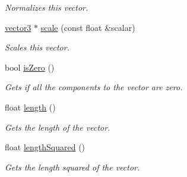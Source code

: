 \begin{DoxyCompactItemize}
\begin{DoxyCompactList}\small\item\em Normalizes this vector. \end{DoxyCompactList}\item 
\hyperlink{classflounder_1_1vector3}{vector3} $\ast$ \hyperlink{classflounder_1_1vector3_ac3556b660b1ce874086da0f185b2630a}{scale} (const float \&scalar)
\begin{DoxyCompactList}\small\item\em Scales this vector. \end{DoxyCompactList}\item 
bool \hyperlink{classflounder_1_1vector3_ad7a7694fbfc9cdd7b05a27684aaed63a}{is\+Zero} ()
\begin{DoxyCompactList}\small\item\em Gets if all the components to the vector are zero. \end{DoxyCompactList}\item 
float \hyperlink{classflounder_1_1vector3_a32bedb9a4d0d3514f716ff3d1a5b3d8b}{length} ()
\begin{DoxyCompactList}\small\item\em Gets the length of the vector. \end{DoxyCompactList}\item 
float \hyperlink{classflounder_1_1vector3_a72a0449a8695adc7be78d4d04eef1a4c}{length\+Squared} ()
\begin{DoxyCompactList}\small\item\em Gets the length squared of the vector. \end{DoxyCompactList}\end{DoxyCompactItemize}
